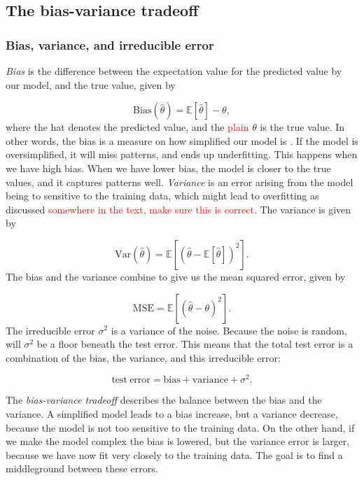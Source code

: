 \subsection{The bias-variance tradeoff}
\subsubsection{Bias, variance, and irreducible error}
\textit{Bias} is the difference between the expectation value for the predicted value by our model, and the true value, given by

\begin{equation}\label{eq:bias}
    \mathrm{Bias}{(\hat\theta)} = \mathbb{E}[\hat{\theta}]-\theta,
\end{equation}
where the hat denotes the predicted value, and the \textcolor{red}{plain} $\theta$ is the true value. In other words, the bias is a measure on how simplified our model is \cite{bias_variance_geeksforgeeks}. If the model is oversimplified, it will miss patterns, and ends up underfitting. This happens when we have high bias. When we have lower bias, the model is closer to the true values, and it captures patterns well. \textit{Variance} is an error arising from the model being to sensitive to the training data, which might lead to overfitting as discussed \textcolor{red}{somewhere in the text, make sure this is correct.} The variance is given by 

\begin{equation}\label{eq:variance}
    \mathrm{Var}(\hat{\theta}) = \mathbb{E}[(\hat{\theta}-\mathbb{E}[\hat{\theta}])^2].
\end{equation}
The bias and the variance combine to give us the mean squared error, given by

\begin{equation}\label{eq:mean_square_error}
    \mathrm{MSE} = \mathbb{E}[(\hat{\theta}-\theta)^2].
\end{equation}
 The irreducible error $\sigma^2$ is a variance of the noise. Because the noise is random, will $\sigma^2$ be a floor beneath the test error. This means that the total test error is a combination of the bias, the variance, and this irreducible error:
 
\begin{equation}\label{eq:total_test_error}
    \mathrm{test\:error} = \mathrm{bias} + \mathrm{variance} + \sigma^2.
\end{equation}

The \textit{bias-variance tradeoff} describes the balance between the bias and the variance. A simplified model leads to a bias increase, but a variance decrease, because the model is not too sensitive to the training data. On the other hand, if we make the model complex the bias is lowered, but the variance error is larger, because we have now fit very closely to the training data. The goal is to find a middleground between these errors.    

